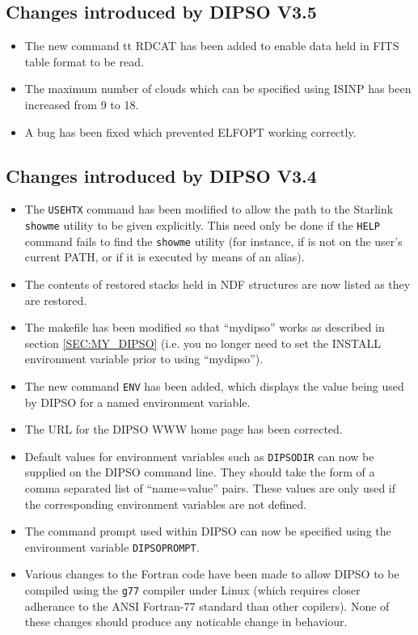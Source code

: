 \documentclass[twoside,11pt]{article}
\renewcommand{\_}{\texttt{\symbol{95}}}
\begin{document}
\subsection{Changes introduced by DIPSO V3.5}
\begin{itemize}
\item The new command {tt RDCAT} has been added to enable data held in FITS 
table format to be read.
\item The maximum number of clouds which can be specified using ISINP has
been increased from 9 to 18.
\item A bug has been fixed which prevented ELFOPT working correctly.
\end{itemize}

\subsection{Changes introduced by DIPSO V3.4}
\begin{itemize}

\item The {\tt USEHTX} command has been modified to allow the path to the
Starlink {\tt showme} utility to be given explicitly. This need only be done 
if the {\tt HELP} command fails to find the {\tt showme} utility (for
instance, if is not on the user's current PATH, or if it is
executed by means of an alias). 

\item The contents of restored stacks held in NDF structures are now
listed as they are restored.

\item The makefile has been modified so that ``my\_dipso'' works as
described in section \ref{SEC:MY_DIPSO} (i.e. you no longer need to
set the INSTALL environment variable prior to using ``my\_dipso'').

\item The new command {\tt ENV} has been added, which displays the value
being used by DIPSO for a named environment variable.

\item The URL for the DIPSO WWW home page has been corrected.

\item Default values for environment variables such as \verb+DIPSODIR+ can
now be supplied on the DIPSO command line. They should take the form of a
comma separated list of ``name=value'' pairs. These values are only used
if the corresponding environment variables are not defined.

\item The command prompt used within DIPSO can now be specified using the 
environment variable \verb+DIPSOPROMPT+.

\item Various changes to the Fortran code have been made to allow DIPSO
to be compiled using the \verb+g77+ compiler under Linux (which requires
closer adherance to the ANSI Fortran-77 standard than other copilers).
None of these changes should produce any noticable change in behaviour.

\end{itemize}
\end{document}
